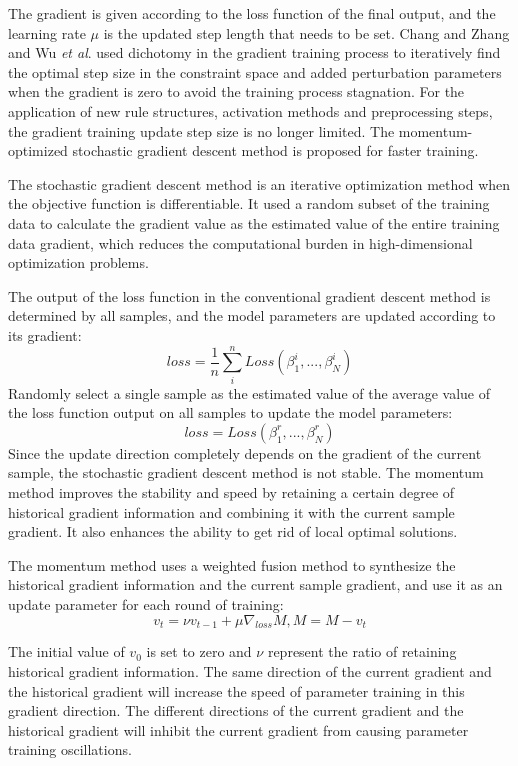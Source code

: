 \documentclass{ieeeaccess}
\begin{document}
The gradient is given according to the loss function of the final output,
and the learning rate $\mu$ is the updated step length that needs to be set.
Chang and Zhang\cite{a11} and Wu \textit{et al}.\cite{a13} used dichotomy in the gradient training process to iteratively find the optimal step size in the constraint space and
added perturbation parameters when the gradient is zero to avoid the training process stagnation.
For the application of new rule structures, activation methods and preprocessing steps, the gradient training update step size is no longer limited.
The momentum-optimized stochastic gradient descent method is proposed for faster training.

The stochastic gradient descent method is an iterative optimization method when the objective function is differentiable.
It used a random subset of the training data to calculate the gradient value as the estimated value of the entire training data gradient,
which reduces the computational burden in high-dimensional optimization problems.

The output of the loss function in the conventional gradient descent method is determined by all samples,
and the model parameters are updated according to its gradient:
\begin{equation}
    loss=\frac{1}{n}\sum_i^nLoss(\beta_1^i,...,\beta_N^i)
\end{equation}
Randomly select a single sample as the estimated value of the average value of the loss function output on all samples to update the model parameters:
\begin{equation}
    loss=Loss(\beta_1^r,...,\beta_N^r)
\end{equation}
Since the update direction completely depends on the gradient of the current sample, the stochastic gradient descent method is not stable.
The momentum method improves the stability and speed by retaining a certain degree of historical gradient information and combining it with the current sample gradient.
It also enhances the ability to get rid of local optimal solutions.

The momentum method uses a weighted fusion method to synthesize the historical gradient information and the current sample gradient,
and use it as an update parameter for each round of training:
\begin{equation}
    v_t=\nu v_{t-1}+\mu\nabla_{loss}M,M=M-v_t
\end{equation}

The initial value of $v_0$ is set to zero and $\nu$ represent the ratio of retaining historical gradient information.
The same direction of the current gradient and the historical gradient will increase the speed of parameter training in this gradient direction.
The different directions of the current gradient and the historical gradient will inhibit the current gradient from causing parameter training oscillations.
\end{document}
